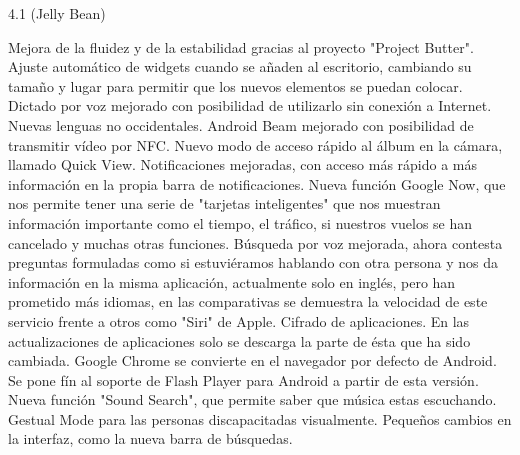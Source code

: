 4.1 (Jelly Bean) 	

    Mejora de la fluidez y de la estabilidad gracias al proyecto "Project Butter".
    Ajuste automático de widgets cuando se añaden al escritorio, cambiando su tamaño y lugar para permitir que los nuevos elementos se puedan colocar.
    Dictado por voz mejorado con posibilidad de utilizarlo sin conexión a Internet.
    Nuevas lenguas no occidentales.
    Android Beam mejorado con posibilidad de transmitir vídeo por NFC.
    Nuevo modo de acceso rápido al álbum en la cámara, llamado Quick View.
    Notificaciones mejoradas, con acceso más rápido a más información en la propia barra de notificaciones.
    Nueva función Google Now, que nos permite tener una serie de "tarjetas inteligentes" que nos muestran información importante como el tiempo, el tráfico, si nuestros vuelos se han cancelado y muchas otras funciones.
    Búsqueda por voz mejorada, ahora contesta preguntas formuladas como si estuviéramos hablando con otra persona y nos da información en la misma aplicación, actualmente solo en inglés, pero han prometido más idiomas, en las comparativas se demuestra la velocidad de este servicio frente a otros como "Siri" de Apple.
    Cifrado de aplicaciones.
    En las actualizaciones de aplicaciones solo se descarga la parte de ésta que ha sido cambiada.
    Google Chrome se convierte en el navegador por defecto de Android.
    Se pone fín al soporte de Flash Player para Android a partir de esta versión.
    Nueva función "Sound Search", que permite saber que música estas escuchando.
    Gestual Mode para las personas discapacitadas visualmente.
    Pequeños cambios en la interfaz, como la nueva barra de búsquedas.






















